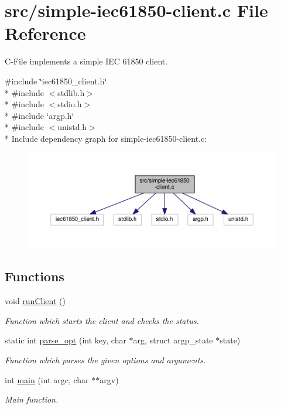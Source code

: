 \hypertarget{simple-iec61850-client_8c}{}\section{src/simple-\/iec61850-\/client.c File Reference}
\label{simple-iec61850-client_8c}


C-\/\+File implements a simple I\+EC 61850 client.  


{\ttfamily \#include \char`\"{}iec61850\+\_\+client.\+h\char`\"{}}\\*
{\ttfamily \#include $<$stdlib.\+h$>$}\\*
{\ttfamily \#include $<$stdio.\+h$>$}\\*
{\ttfamily \#include \char`\"{}argp.\+h\char`\"{}}\\*
{\ttfamily \#include $<$unistd.\+h$>$}\\*
Include dependency graph for simple-\/iec61850-\/client.c\+:\nopagebreak
\begin{figure}[H]
\begin{center}
\leavevmode
\includegraphics[width=350pt]{simple-iec61850-client_8c__incl}
\end{center}
\end{figure}
\subsection*{Functions}
\begin{DoxyCompactItemize}
\item 
void \hyperlink{simple-iec61850-client_8c_a19c4ac63742805a0bfd8fc4a512b42d3}{run\+Client} ()
\begin{DoxyCompactList}\small\item\em Function which starts the client and checks the status. \end{DoxyCompactList}\item 
static int \hyperlink{simple-iec61850-client_8c_aaf7bc24f3891f0c63a6043f4dc2ab311}{parse\+\_\+opt} (int key, char $\ast$arg, struct argp\+\_\+state $\ast$state)
\begin{DoxyCompactList}\small\item\em Function which parses the given options and arguments. \end{DoxyCompactList}\item 
int \hyperlink{simple-iec61850-client_8c_a3c04138a5bfe5d72780bb7e82a18e627}{main} (int argc, char $\ast$$\ast$argv)
\begin{DoxyCompactList}\small\item\em Main function. \end{DoxyCompactList}\end{DoxyCompactItemize}
